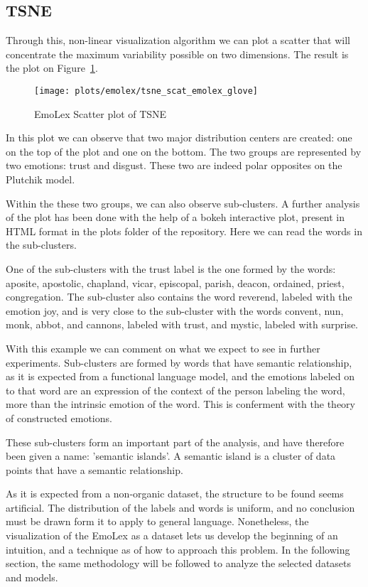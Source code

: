 \subsection{TSNE}
Through this, non-linear visualization algorithm we can plot a scatter that will concentrate the maximum variability possible on two dimensions. The result is the plot on Figure~\ref{fig:tsne_scat_emolex_glove}.

\begin{figure}[H]
  \texttt{[image: plots/emolex/tsne\_scat\_emolex\_glove]}
  \centering
  \caption{EmoLex Scatter plot of TSNE}\label{fig:tsne_scat_emolex_glove}
\end{figure}

In this plot we can observe that two major distribution centers are created: one on the top of the plot and one on the bottom. The two groups are represented by two emotions: trust and disgust. These two are indeed polar opposites on the Plutchik model.

Within the these two groups, we can also observe sub-clusters. A further analysis of the plot has been done with the help of a bokeh interactive plot, present in HTML format in the plots folder of the repository. Here we can read the words in the sub-clusters.

One of the sub-clusters with the trust label is the one formed by the words: aposite, apostolic, chapland, vicar, episcopal, parish, deacon, ordained, priest, congregation. The sub-cluster also contains the word reverend, labeled with the emotion joy, and is very close to the sub-cluster with the words convent, nun, monk, abbot, and cannons, labeled with trust, and mystic, labeled with surprise.

With this example we can comment on what we expect to see in further experiments. Sub-clusters are formed by words that have semantic relationship, as it is expected from a functional language model, and the emotions labeled on to that word are an expression of the context of the person labeling the word, more than the intrinsic emotion of the word. This is conferment with the theory of constructed emotions.

These sub-clusters form an important part of the analysis, and have therefore been given a name: 'semantic islands'. A semantic island is a cluster of data points that have a semantic relationship.

As it is expected from a non-organic dataset, the structure to be found seems artificial. The distribution of the labels and words is uniform, and no conclusion must be drawn form it to apply to general language. Nonetheless, the visualization of the EmoLex as a dataset lets us develop the beginning of an intuition, and a technique as of how to approach this problem. In the following section, the same methodology will be followed to analyze the selected datasets and models.



